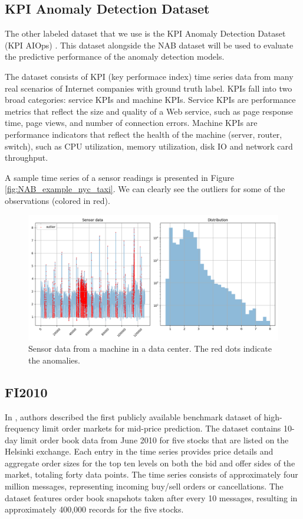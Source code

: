 \documentclass[a4paper, twoside]{report}
\theoremstyle{definition}
\numberwithin{equation}{section}
\begin{document}
\subsection{KPI Anomaly Detection Dataset}

The other labeled dataset that we use is the KPI Anomaly Detection Dataset (KPI AIOps) \cite{2208.03938}.
This dataset alongside the NAB dataset will be used to evaluate the predictive performance of the anomaly detection models.

The dataset consists of KPI (key performace index) time series data from many
real scenarios of Internet companies with ground truth label. KPIs fall into two
broad categories: service KPIs and machine KPIs. Service KPIs are performance metrics
that reflect the size and quality of a Web service, such as page response time, page views,
and number of connection errors. Machine KPIs are performance indicators that reflect
the health of the machine (server, router, switch), such as CPU utilization, memory utilization,
disk IO and network card throughput.

A sample time series of a sensor readings is presented in Figure \ref{fig:NAB_example_nyc_taxi}.
We can clearly see the outliers for some of the observations (colored in red).
\begin{figure}[h!]
    \centering
    \includegraphics[scale=0.48]{KPIAIOps_example.png}
    \caption{Sensor data from a machine in a data center. The red dots indicate the anomalies.}
    \label{fig:KPIAIOps_example}
\end{figure}

\subsection{FI2010}

In \cite{1705.03233}, authors described the first publicly available benchmark dataset of high-frequency limit order markets for mid-price prediction.
The dataset contains 10-day limit order book data from June 2010 for five stocks that are listed on the Helsinki exchange.
Each entry in the time series provides price details and aggregate order sizes for the top ten levels on both the bid and offer sides of the market,
totaling forty data points. The time series consists of approximately four million messages, representing incoming buy/sell orders or cancellations.
The dataset features order book snapshots taken after every 10 messages, resulting in approximately 400,000 records for the five stocks.
\end{document}
